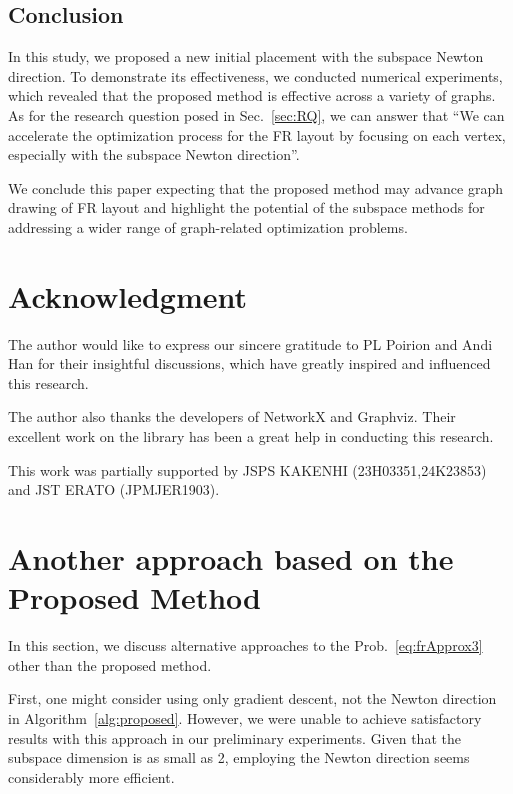 \documentclass[dvipdfmx,10pt,journal,compsoc]{IEEEtran}
\begin{document}
\subsection{Conclusion} \label{sec:conclusion}

In this study, we proposed a new initial placement with the subspace Newton direction.
To demonstrate its effectiveness, we conducted numerical experiments, which revealed that the proposed method is effective across a variety of graphs. As for the research question posed in Sec.~\ref{sec:RQ}, we can answer that ``We can accelerate the optimization process for the FR layout by focusing on each vertex, especially with the subspace Newton direction''.

We conclude this paper expecting that the proposed method may advance graph drawing of FR layout and highlight the potential of the subspace methods for addressing a wider range of graph-related optimization problems.

\section{Acknowledgment}

The author would like to express our sincere gratitude to PL Poirion and Andi Han for their insightful discussions, which have greatly inspired and influenced this research.

The author also thanks the developers of NetworkX and Graphviz. Their excellent work on the library has been a great help in conducting this research.

This work was partially supported by JSPS KAKENHI (23H03351,24K23853) and JST ERATO (JPMJER1903).


\appendices

\section{Another approach based on the Proposed Method}\label{sec:anotherApproach}

In this section, we discuss alternative approaches to the Prob.~\eqref{eq:frApprox3} other than the proposed method.

First, one might consider using only gradient descent, not the Newton direction in Algorithm~\ref{alg:proposed}.
However, we were unable to achieve satisfactory results with this approach in our preliminary experiments.
Given that the subspace dimension is as small as 2, employing the Newton direction seems considerably more efficient.
\end{document}
